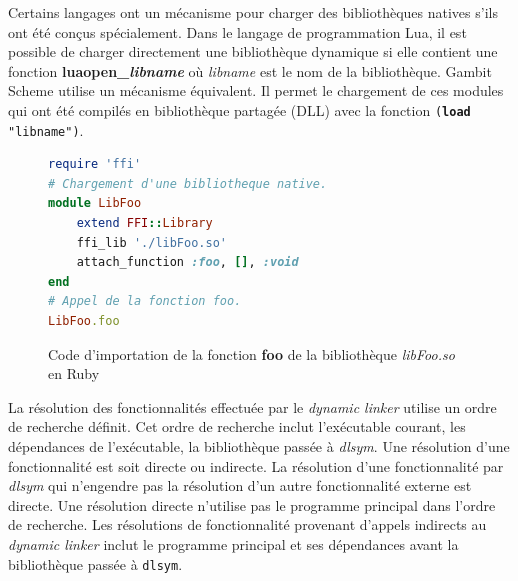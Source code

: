Certains langages ont un mécanisme pour charger des bibliothèques natives s'ils
ont été conçus spécialement.  Dans le langage de programmation Lua, il est
possible de charger directement une bibliothèque dynamique si elle contient une
fonction \textbf{luaopen\_\textit{libname}} où \textit{libname} est le nom de
la bibliothèque.  Gambit Scheme utilise un mécanisme équivalent. Il permet le
chargement de ces modules qui ont été compilés en bibliothèque partagée (DLL)
avec la fonction \texttt{(\textbf{load} "libname")}.


\begin{center}
\begin{figure}[ht]
\begin{lstlisting}[language=ruby,frame=single]
require 'ffi'
# Chargement d'une bibliotheque native.
module LibFoo
    extend FFI::Library
    ffi_lib './libFoo.so'
    attach_function :foo, [], :void
end
# Appel de la fonction foo.
LibFoo.foo
\end{lstlisting}
\caption{Code d'importation de la fonction \textbf{foo} de la bibliothèque
  \textit{libFoo.so} en Ruby}
\end{figure}
\end{center}

La résolution des fonctionnalités effectuée par le \textit{dynamic linker}
utilise un ordre de recherche définit. Cet ordre de recherche inclut
l'exécutable courant, les dépendances de l'exécutable, la bibliothèque passée à
\textit{dlsym}. Une résolution d'une fonctionnalité est soit directe ou
indirecte. La résolution d'une fonctionnalité par \textit{dlsym} qui n'engendre
pas la résolution d'un autre fonctionnalité externe est directe. Une résolution
directe n'utilise pas le programme principal dans l'ordre de recherche.
Les résolutions de fonctionnalité provenant d'appels indirects au
\textit{dynamic linker} inclut le programme principal et ses dépendances avant
la bibliothèque passée à \verb|dlsym|.

